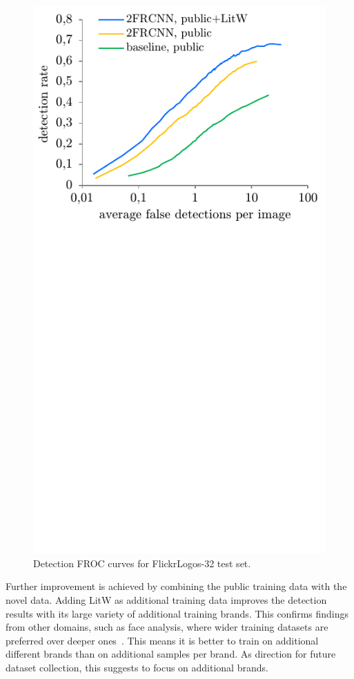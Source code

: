 \documentclass[a4paper,twoside]{article}
\begin{document}
\begin{figure}%
\centering%
\includegraphics[width=\linewidth, trim=0cm 9cm 0cm 0cm, clip]{img/detectionFroc.pdf}%
\caption{Detection FROC curves for FlickrLogos-32 test set.}%
\label{fig:detectionFroc}
\end{figure}%
%

Further improvement is achieved by combining the public training data with the novel data.
Adding \ac{LitW} as additional training data improves the detection results with its large variety of additional training brands. 
This confirms findings from other domains, such as face analysis, where wider training datasets are preferred over deeper ones~\cite{bansal2017}. This means it is better to train on additional different brands than on additional samples per brand.
As direction for future dataset collection, this suggests to focus on additional brands.
\end{document}
